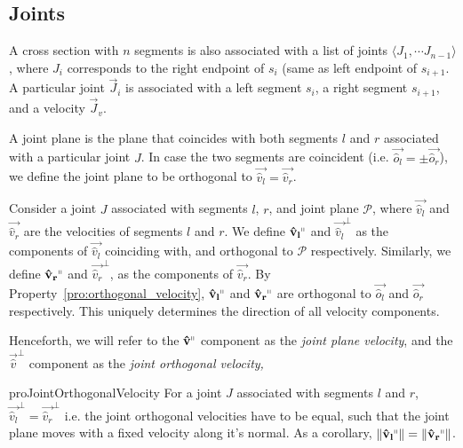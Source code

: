 \subsection{Joints}
\label{sec:joints}

\begin{definition}
\label{def:joints}
A cross section with $n$ segments is also associated with a list of joints $ \langle J_1,\cdots J_{n-1} \rangle$,
where $J_i$ corresponds to the right endpoint of $s_i$ (same as left endpoint of $s_{i+1}$.
A particular joint $\vec J_i$ is associated with a left segment $s_i$, a right segment $s_{i+1}$, and a velocity $\vec J_v$.
\end{definition}

\begin{definition}
\label{def:joint_plane}
A joint plane is the plane that coincides with both segments $l$ and $r$ associated with a particular joint $J$.
In case the two segments are coincident (i.e. $\vec{\hat o_l} = \pm \vec{\hat o_r}$),
we define the joint plane to be orthogonal to $\vec{\hat v_l} = \vec{\hat v_r}$.
\end{definition}

\begin{definition}
\label{def:joint_plane_velocity}
Consider a joint $J$ associated with segments $l$, $r$, and joint plane $\mathcal P$,
where $\vec{\hat v_l}$ and $\vec{\hat v_r}$ are the velocities of segments $l$ and $r$.
We define $\vec{\hat v_l}^\shortparallel$ and $\vec{\hat v_l}^\perp$ as the components of $\vec{\hat v_l}$ coinciding with,
and orthogonal to $\mathcal P$ respectively.
Similarly, we define $\vec{\hat v_r}^\shortparallel$ and $\vec{\hat v_r}^\perp$, as the components of $\vec{\hat v_r}$.
By Property~\ref{pro:orthogonal_velocity}, $\vec{\hat v_l}^\shortparallel$ and $\vec{\hat v_r}^\shortparallel$
are orthogonal to $\vec{\hat o_l}$ and $\vec{\hat o_r}$ respectively.
This uniquely determines the direction of all velocity components.
\end{definition}

Henceforth, we will refer to the $\vec{\hat v}^\shortparallel$ component as the \emph{joint plane velocity},
and the $\vec{\hat v}^\perp$ component as the \emph{joint orthogonal velocity,}

\begin{restatable}{pro}{JointOrthogonalVelocity}
\label{pro:joint_orthogonal_velocity}
For a joint $J$ associated with segments $l$ and $r$, $\vec{\hat v_l}^\perp = \vec{\hat v_r}^\perp$
i.e. the joint orthogonal velocities have to be equal, such that the joint plane moves with a fixed velocity along it's normal.
As a corollary, $ \left\| \vec{\hat v_l}^\shortparallel\right\| = \left\| \vec{\hat v_r}^\shortparallel\right\|$.
\end{restatable}
